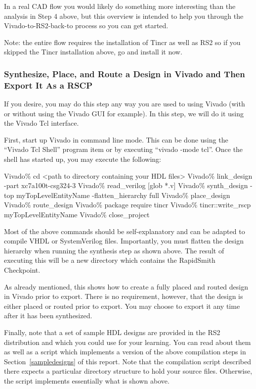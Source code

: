 In a real CAD flow you would likely do something more interesting
than the analysis in Step 4 above, but this overview is intended to help you
through the Vivado-to-RS2-back-to process so you can get started.

Note: the entire flow requires the installation of Tincr as well as RS2 so if
you skipped the Tincr installation above, go and install it now.

\subsubsection{Synthesize, Place, and Route a Design in Vivado and Then Export
It As a RSCP} If you desire, you may do this step any way you are used to using
Vivado (with or without using the Vivado GUI for example).  In this step, we
will do it using the Vivado Tcl interface.

First, start up Vivado in command line mode.  This can be done using the
``Vivado Tcl Shell'' program item or by executing ``vivado -mode tcl''.  Once
the shell has started up, you may execute the following:
                
\vspace{-0.15in}  \begin{code}
	Vivado\% cd <path to directory containing your HDL files>
	Vivado\% link_design -part xc7a100t-csg324-3
	Vivado\% read_verilog [glob *.v]
	Vivado\% synth_design -top myTopLevelEntityName -flatten_hierarchy full 
	Vivado\% place_design
	Vivado\% route_design
	Vivado\% package require tincr
	Vivado\% tincr::write_rscp myTopLevelEntityName
	Vivado\% close_project
\end{code}
Most of the above commands should be self-explanatory and can be adapted to
compile VHDL or SystemVerilog files.
Importantly,  you must flatten the design hierarchy when running
the synthesis step as shown above.  The result of executing this will be a new
directory which contains the RapidSmith Checkpoint.

As already mentioned, this shows how to create a fully placed and routed design
in Vivado prior to export.  There is no requirement, however, that the design is
either placed or routed prior to export.  You may choose to export it any time
after it has been synthesized.

Finally, note that a set of sample HDL designs are provided in the RS2
distribution and which you could use for your learning.
You can read about them as well as a script which implements a version of the
above compilation steps in Section~\ref{sampledesigns} of this report.  Note
that the compilation script described there expects a particular directory
structure to hold your source files.  Otherwise, the script implements 
essentially what is shown above.

